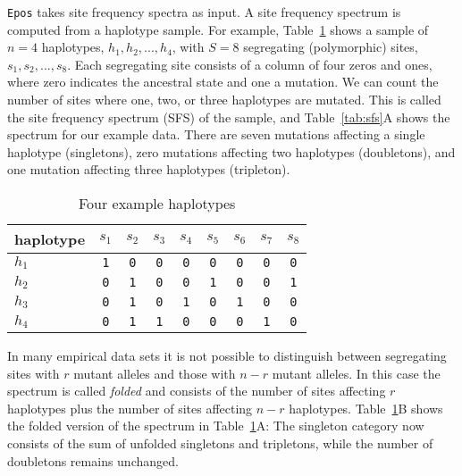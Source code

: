 \documentclass[a4paper, english]{article}
\newcommand{\ty}{\texttt}
\begin{document}
\ty{Epos} takes site frequency spectra as input. A site frequency
spectrum is computed from a haplotype sample. For example, Table~\ref{tab:hap}
shows a sample of $n=4$ haplotypes, $h_1, h_2,...,h_4$, with $S=8$
segregating (polymorphic) sites, $s_1, s_2,...,s_8$. Each segregating
site consists of a column of four zeros and ones, where zero indicates
the ancestral state and one a mutation. We can count the number of
sites where one, two, or three haplotypes are mutated. This is called
the site frequency spectrum (SFS) of the sample, and
Table~\ref{tab:sfs}A shows the spectrum for our example data. There
are seven mutations affecting a single haplotype (singletons), zero
mutations affecting two haplotypes (doubletons), and one mutation
affecting three haplotypes (tripleton).
\begin{table}
  \caption{Four example haplotypes}\label{tab:hap}
  \begin{center}
    \begin{tabular}{lcccccccc}\hline
haplotype   &   $s_1$ & $s_2$ & $s_3$ & $s_4$ & $s_5$ & $s_6$ & $s_7$ & $s_8$\\\hline
$h_1$ &      \ty{1} & \ty{0} & \ty{0} & \ty{0} & \ty{0} & \ty{0} & \ty{0} & \ty{0}\\
$h_2$ &      \ty{0} & \ty{1} & \ty{0} & \ty{0} & \ty{1} & \ty{0} & \ty{0} & \ty{1}\\
$h_3$ &      \ty{0} & \ty{1} & \ty{0} & \ty{1} & \ty{0} & \ty{1} & \ty{0} & \ty{0}\\
$h_4$ &      \ty{0} & \ty{1} & \ty{1} & \ty{0} & \ty{0} & \ty{0} & \ty{1} &
      \ty{0}\\\hline
      \end{tabular}
  \end{center}
\end{table}
In many empirical data sets it is not possible to distinguish between
segregating sites with $r$ mutant alleles and those with $n-r$
mutant alleles. In this case the spectrum is called \textit{folded} and
consists of the
number of sites affecting $r$ haplotypes plus the number of sites
affecting $n-r$ haplotypes. Table~\ref{tab:hap}B shows the folded
version of the spectrum in Table~\ref{tab:hap}A: The singleton
category now consists of the sum of unfolded singletons and
tripletons, while the number of doubletons
remains unchanged.
\end{document}

